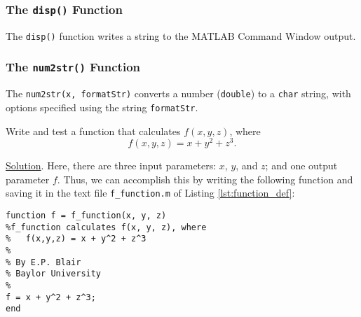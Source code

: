 \subsubsection{The \texttt{disp()} Function}
The \texttt{disp()} function writes a string to the MATLAB Command Window output.

\subsubsection{The \texttt{num2str()} Function}
The \texttt{num2str(x, formatStr)} converts a number (\texttt{double}) to a \texttt{char} string, with options specified using the string \texttt{formatStr}.

Write and test a function that calculates $f(x,y,z)$, where $$f(x,y,z) = x + y^2 + z^3 .$$

\noindent \underline{Solution}.
Here, there are three input parameters: $x$, $y$, and $z$; and one output parameter $f$. Thus, we can accomplish this by writing the following function and saving it in the text file \texttt{f\_function.m} of Listing \ref{lst:function_def}:
\begin{lstlisting}[style=Matlab-editor, caption={The code of the function-definition file \texttt{f\_function.m}.}, label={lst:function_def}]
function f = f_function(x, y, z)
%f_function calculates f(x, y, z), where
%   f(x,y,z) = x + y^2 + z^3
%
% By E.P. Blair
% Baylor University
%
f = x + y^2 + z^3;
end
\end{lstlisting}

